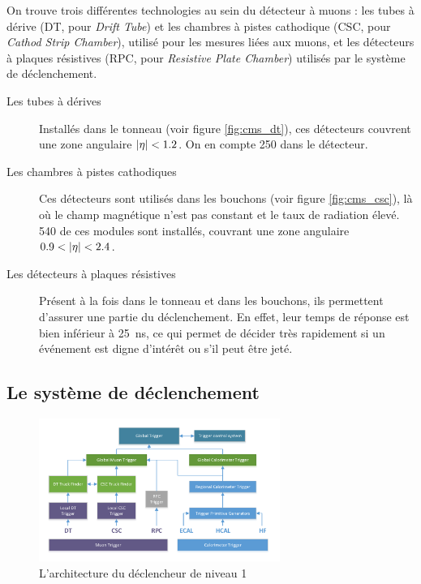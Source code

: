 On trouve trois différentes technologies au sein du détecteur à muons : les tubes à dérive (DT, pour \emph{Drift Tube}) et les chambres à pistes cathodique (CSC, pour \emph{Cathod Strip Chamber}), utilisé pour les mesures liées aux muons, et les détecteurs à plaques résistives (RPC, pour \emph{Resistive Plate Chamber}) utilisés par le système de déclenchement.

\begin{description}
  \item[Les tubes à dérives] Installés dans le tonneau (voir figure \ref{fig:cms_dt}), ces détecteurs couvrent une zone angulaire $\lvert \eta \rvert < 1.2$. On en compte 250 dans le détecteur.
  \item[Les chambres à pistes cathodiques] Ces détecteurs sont utilisés dans les bouchons (voir figure \ref{fig:cms_csc}), là où le champ magnétique n'est pas constant et le taux de radiation élevé. 540 de ces modules sont installés, couvrant une zone angulaire $\num{0.9} < \lvert \eta \rvert < \num{2.4}$.
  \item[Les détecteurs à plaques résistives] Présent à la fois dans le tonneau et dans les bouchons, ils permettent d'assurer une partie du déclenchement. En effet, leur temps de réponse est bien inférieur à \SI{25}{\ns}, ce qui permet de décider très rapidement si un événement est digne d’intérêt ou s'il peut être jeté.
\end{description}


\subsection{Le système de déclenchement}

\begin{figure} \centering
  \includegraphics[width=0.7\textwidth]{chapitre2/figs/L1.pdf}
  \caption{L'architecture du déclencheur de niveau 1}
  \label{fig:l1}
\end{figure}

